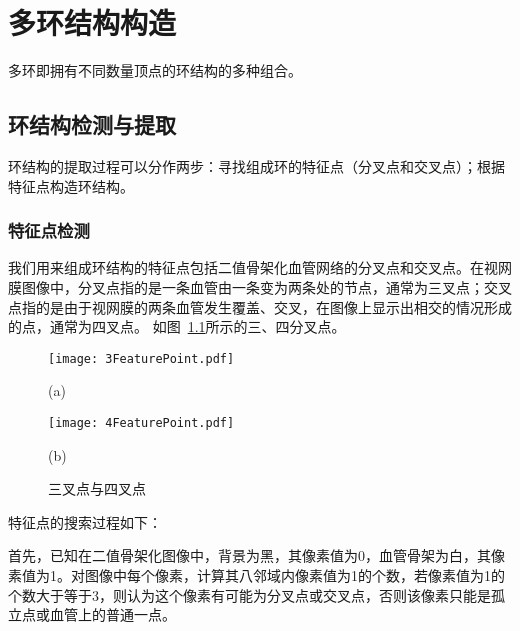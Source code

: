 
\chapter{多环结构构造}
多环即拥有不同数量顶点的环结构的多种组合。 

\section{环结构检测与提取}
环结构的提取过程可以分作两步：寻找组成环的特征点（分叉点和交叉点）；根据特征点构造环结构。
\subsection{特征点检测}
我们用来组成环结构的特征点包括二值骨架化血管网络的分叉点和交叉点。在视网膜图像中，分叉点指的是一条血管由一条变为两条处的节点，通常为三叉点；交叉点指的是由于视网膜的两条血管发生覆盖、交叉，在图像上显示出相交的情况形成的点，通常为四叉点。 如图~\ref{34bifur}所示的三、四分叉点。
\begin{figure}[ht!]
  \centering
  \begin{minipage}[b]{0.45\linewidth} 
      \centering 
  \texttt{[image: 3FeaturePoint.pdf]}
        \centerline{(a)}\medskip
    \end{minipage}
  \begin{minipage}[b]{0.45\linewidth} 
      \centering 
  \texttt{[image: 4FeaturePoint.pdf]}
    \centerline{(b)}\medskip
      \end{minipage}
  \caption{三叉点与四叉点}
    \label{34bifur}
 \end{figure}

特征点的搜索过程如下：

首先，已知在二值骨架化图像中，背景为黑，其像素值为0，血管骨架为白，其像素值为1。对图像中每个像素，计算其八邻域内像素值为1的个数，若像素值为1的个数大于等于3，则认为这个像素有可能为分叉点或交叉点，否则该像素只能是孤立点或血管上的普通一点。  

